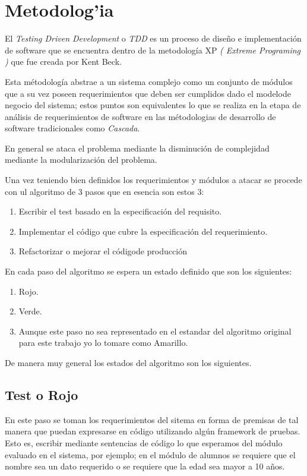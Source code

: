 \chapter{Metodolog'ia}

El \textit{Testing Driven Development} o \textit{TDD} es un proceso de dise\~no e implementaci\'on de software que se encuentra dentro de la metodolog\'ia XP \textit{( Extreme Programing )} que fue creada por Kent Beck.

Esta m\'etodolog\'ia abstrae a un sistema complejo como un conjunto de m\'odulos que a su vez poseen requerimientos que deben ser cumplidos dado el modelode negocio del sistema;
estos puntos son equivalentes lo que se realiza en la etapa de an\'alisis de requerimientos de software en las m\'etodologias de desarrollo de software tradicionales como
\textit{Cascada}.

En general se ataca el problema mediante la disminuci\'on de complejidad mediante la modularizaci\'on del problema.


Una vez teniendo bien definidos los requerimientos y m\'odulos a atacar se procede con ul algoritmo de 3 pasos que en esencia son estos 3:
\begin{enumerate}
    \item Escribir el test basado en la especificación del requisito.
    \item Implementar el c\'odigo que cubre la especificaci\'on del requerimiento.
    \item Refactorizar o mejorar el c\'odigode producci\'on
\end{enumerate}

En cada paso del algoritmo se espera un estado definido que son los siguientes:
\begin{enumerate}
    \item Rojo.
    \item Verde.
    \item Aunque este paso no sea representado en el estandar del algoritmo original para este trabajo yo lo tomare como Amarillo.
\end{enumerate}

De manera muy general los estados del algoritmo son los siguientes.

\section{Test o Rojo}
En este paso se toman los requerimientos del sitema en forma de premisas de tal manera que puedan expresarse en código utilizando algún framework de pruebas.
Esto es, escribir mediante sentencias de código lo que esperamos del m\'odulo evaluado en el sistema, por ejemplo; en el m\'odulo de alumnos se requiere que el nombre sea
un dato requerido o se requiere que la edad sea mayor a 10 a\~nos.


